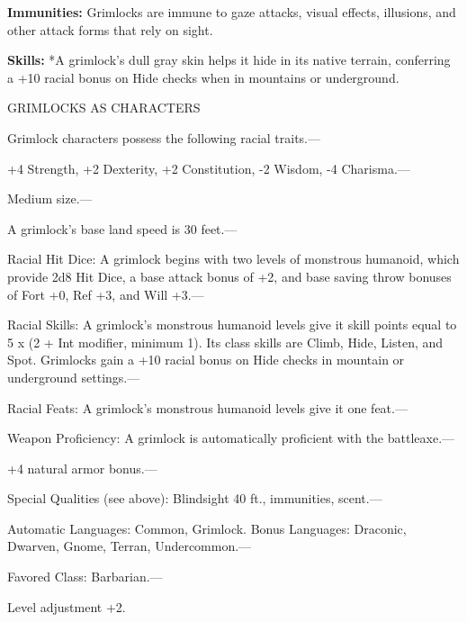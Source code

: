 \documentclass{article}
\begin{document}
\textbf{Immunities: }Grimlocks are immune to gaze attacks, visual effects, illusions, 
and other attack forms that rely on sight.

\textbf{Skills:} *A grimlock's dull gray skin helps it hide in its native terrain, 
conferring a +10 racial bonus on Hide checks when in mountains or underground.

GRIMLOCKS AS CHARACTERS

Grimlock characters possess the following racial traits.--- 

\parindent=3pt
+4 Strength, +2 Dexterity, +2 Constitution, -2 Wisdom, -4 Charisma.---

\parindent=0pt
Medium size.---

A grimlock's base land speed is 30 feet.---

Racial Hit Dice: A grimlock begins with two levels of monstrous humanoid, which 
provide 2d8 Hit Dice, a base attack bonus of +2, and base saving throw bonuses 
of Fort +0, Ref +3, and Will +3.---

Racial Skills: A grimlock's monstrous humanoid levels give it skill points equal 
to 5 x (2 + Int modifier, minimum 1). Its class skills are Climb, Hide, Listen, 
and Spot. Grimlocks gain a +10 racial bonus on Hide checks in mountain or underground 
settings.---

Racial Feats: A grimlock's monstrous humanoid levels give it one feat.---

Weapon Proficiency: A grimlock is automatically proficient with the battleaxe.--- 

\parindent=3pt
+4 natural armor bonus.---

\parindent=0pt
Special Qualities (see above): Blindsight 40 ft., immunities, scent.---

Automatic Languages: Common, Grimlock. Bonus Languages: Draconic, Dwarven, Gnome, 
Terran, Undercommon.---

Favored Class: Barbarian.---

Level adjustment +2.

\newpage
\end{document}

